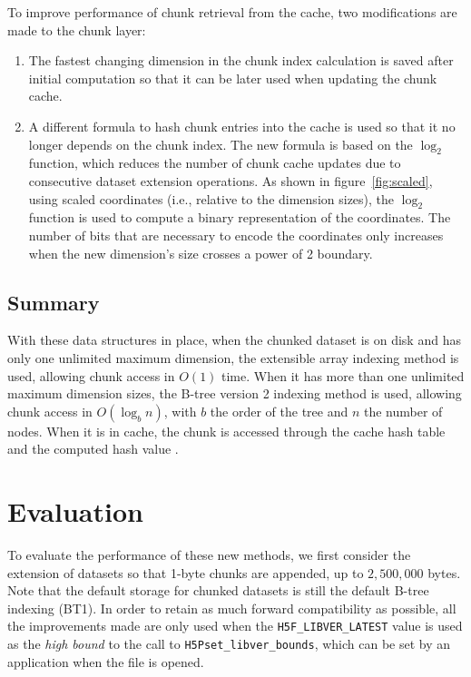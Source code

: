 To improve performance of chunk retrieval from the cache, two
modifications are made to the chunk layer:
\begin{enumerate}
\item The fastest changing dimension in the chunk index calculation is saved after
initial computation so that it can be later used when updating the chunk cache.
\item A different formula to hash chunk entries into the cache is used so that
it no longer depends on the chunk index. The new formula is based on the
$\log_2$ function, which reduces the number of chunk cache
updates due to consecutive dataset extension operations. As shown
in figure~\ref{fig:scaled}, using scaled coordinates (i.e., relative to the
dimension sizes), the $\log_2$ function is used to compute
a binary representation of the coordinates. The number of bits that are necessary
to encode the coordinates only increases when the new dimension's size crosses
a power of 2 boundary.
\end{enumerate}

\begin{figure*}
\centering

\caption{Example of hash-value computation that is used to retrieve chunks using
 scaled coordinates in a 3-dimensional dataset.}
\label{fig:scaled}
\end{figure*}

\subsection{Summary}

With these data structures in place, when the chunked dataset is on disk and
has only one unlimited maximum dimension, the extensible array indexing method is used,
allowing chunk access in $O(1)$ time. When it has more than one unlimited
maximum dimension sizes, the B-tree version 2 indexing method is used, allowing
chunk access in $O(\log_b{n})$, with $b$ the order of the tree and $n$ the
number of nodes. When it is in cache, the chunk is accessed through the cache
hash table and the computed hash value .

\section{Evaluation}
\label{sec:evaluation}

To evaluate the performance of these new methods, we first consider the extension
of datasets so that 1-byte chunks are appended, up to $2,500,000$ bytes.
Note that the default storage for chunked datasets is still the default
B-tree indexing (BT1). In order to retain as much forward compatibility as
possible, all the improvements made are only used when the
\texttt{H5F\_LIBVER\_LATEST} value is used as the \textit{high bound} to the
call to \texttt{H5Pset\_libver\_bounds}, which can be set by an application
when the file is opened.

